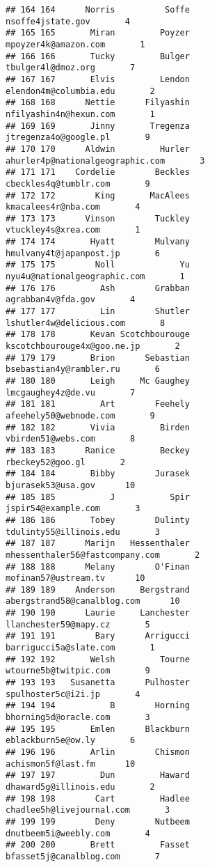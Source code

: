 \documentclass[]{article}
\begin{document}
\begin{verbatim}
## 164 164      Norris          Soffe                  nsoffe4jstate.gov       4
## 165 165       Miran         Poyzer               mpoyzer4k@amazon.com       1
## 166 166       Tucky         Bulger                 tbulger4l@dmoz.org       7
## 167 167       Elvis         Lendon             elendon4m@columbia.edu       2
## 168 168      Nettie      Filyashin             nfilyashin4n@hexun.com       1
## 169 169       Jinny       Tregenza              jtregenza4o@google.pl       9
## 170 170      Aldwin         Hurler   ahurler4p@nationalgeographic.com       3
## 171 171    Cordelie        Beckles              cbeckles4q@tumblr.com       9
## 172 172        King       MacAlees                kmacalees4r@nba.com       4
## 173 173      Vinson        Tuckley                vtuckley4s@xrea.com       1
## 174 174       Hyatt        Mulvany            hmulvany4t@japanpost.jp       6
## 175 175        Noll             Yu       nyu4u@nationalgeographic.com       1
## 176 176         Ash        Grabban                 agrabban4v@fda.gov       4
## 177 177         Lin        Shutler           lshutler4w@delicious.com       8
## 178 178       Kevan Scotchbourouge        kscotchbourouge4x@goo.ne.jp       2
## 179 179       Brion      Sebastian            bsebastian4y@rambler.ru       6
## 180 180       Leigh     Mc Gaughey                 lmcgaughey4z@de.vu       7
## 181 181         Art        Feehely             afeehely50@webnode.com       9
## 182 182       Vivia         Birden                 vbirden51@webs.com       8
## 183 183      Ranice         Beckey                   rbeckey52@goo.gl       2
## 184 184       Bibby        Jurasek                 bjurasek53@usa.gov      10
## 185 185           J           Spir                jspir54@example.com       3
## 186 186       Tobey        Dulinty            tdulinty55@illinois.edu       3
## 187 187      Marijn   Hessenthaler    mhessenthaler56@fastcompany.com       2
## 188 188      Melany        O'Finan               mofinan57@ustream.tv      10
## 189 189    Anderson     Bergstrand        abergstrand58@canalblog.com      10
## 190 190      Laurie     Lanchester              llanchester59@mapy.cz       5
## 191 191        Bary      Arrigucci             barrigucci5a@slate.com       1
## 192 192       Welsh         Tourne              wtourne5b@twitpic.com       9
## 193 193   Susanetta      Pulhoster                spulhoster5c@i2i.jp       4
## 194 194           B        Horning              bhorning5d@oracle.com       3
## 195 195       Emlen      Blackburn                 eblackburn5e@ow.ly       6
## 196 196       Arlin        Chismon                 achismon5f@last.fm      10
## 197 197         Dun         Haward             dhaward5g@illinois.edu       2
## 198 198        Cart         Hadlee          chadlee5h@livejournal.com       3
## 199 199        Deny        Nutbeem              dnutbeem5i@weebly.com       4
## 200 200       Brett         Fasset            bfasset5j@canalblog.com       7
\end{verbatim}
\end{document}

